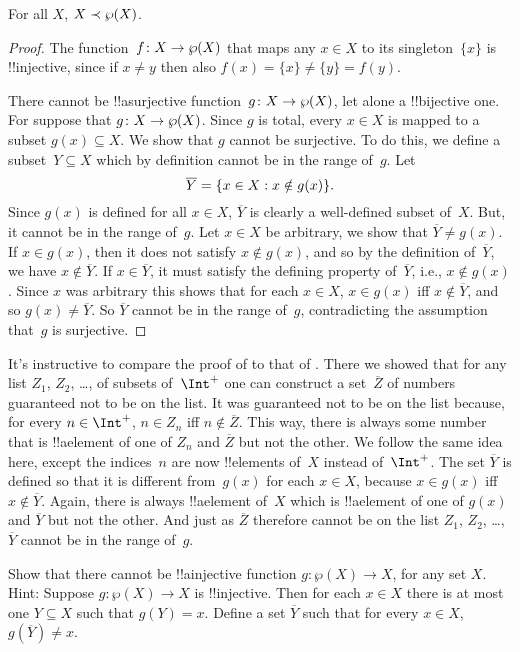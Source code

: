 \documentclass[../../../include/open-logic-section]{subfiles}
\begin{document}
\begin{thm}[Cantor]
For all $X$, $X \prec \wp(X)$.
\end{thm}

\begin{proof}
The function~$f \colon X \to \wp(X)$ that maps any $x \in X$ to its
singleton~$\{x\}$ is !!{injective}, since if $x \neq y$ then also $f(x) =
\{x\} \neq \{y\} = f(y)$.

There cannot be !!a{surjective} function~$g\colon X \to \wp(X)$, let
alone a !!{bijective} one. For suppose that $g\colon X \to \wp(X)$.
Since $g$ is total, every $x \in X$ is mapped to a subset $g(x)
\subseteq X$. We show that $g$ cannot be surjective. To do this, we
define a subset~$Y \subseteq X$ which by definition cannot be in the
range of~$g$. Let
\[
\overline{Y} = \{ x \in X : x \notin g(x) \}.
\]
Since $g(x)$ is defined for all $x \in X$, $\overline{Y}$ is clearly a
well-defined subset of~$X$.  But, it cannot be in the range
of~$g$. Let $x \in X$ be arbitrary, we show that $\overline{Y} \neq
g(x)$.  If $x \in g(x)$, then it does not satisfy $x \notin g(x)$, and
so by the definition of~$\overline{Y}$, we have $x \notin
\overline{Y}$.  If $x \in \overline{Y}$, it must satisfy the defining
property of~$\overline{Y}$, i.e., $x \notin g(x)$.  Since $x$ was
arbitrary this shows that for each $x \in X$, $x \in g(x)$ iff $x
\notin \overline{Y}$, and so $g(x) \neq \overline{Y}$.  So
$\overline{Y}$ cannot be in the range of~$g$, contradicting the
assumption that~$g$ is surjective.
\end{proof}

\begin{explain}
  It's instructive to compare the proof of  to that
  of . There we showed that for any
  list $Z_1$, $Z_2$, \dots, of subsets of~$\Int^+$ one can construct a
  set~$\overline{Z}$ of numbers guaranteed not to be on the list. It
  was guaranteed not to be on the list because, for every $n \in
  \Int^+$, $n \in Z_n$ iff $n \notin \overline{Z}$. This way, there is
  always some number that is !!a{element} of one of $Z_n$ and
  $\overline{Z}$ but not the other. We follow the same idea here,
  except the indices~$n$ are now !!{element}s of~$X$ instead
  of~$\Int^+$. The set $\overline{Y}$ is defined so that it is
  different from~$g(x)$ for each $x \in X$, because $x \in g(x)$ iff
  $x \notin \overline{Y}$. Again, there is always !!a{element} of~$X$
  which is !!a{element} of one of $g(x)$ and $\overline{Y}$ but not
  the other. And just as $\overline{Z}$ therefore cannot be on the
  list $Z_1$, $Z_2$, \dots, $\overline{Y}$ cannot be in the range
  of~$g$.
\end{explain}

\begin{prob}
  Show that there cannot be !!a{injective} function $g\colon \wp(X) \to
  X$, for any set $X$. Hint: Suppose $g\colon \wp(X) \to X$ is
  !!{injective}. Then for each $x \in X$ there is at most one $Y \subseteq
  X$ such that $g(Y) = x$. Define a set $\overline{Y}$ such that for
  every $x \in X$, $g(\overline{Y}) \neq x$.
\end{prob}
\end{document}
